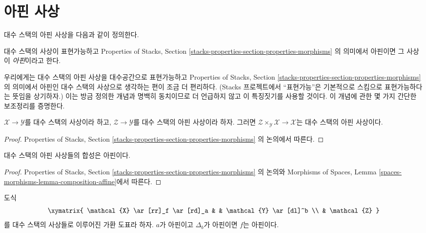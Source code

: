 \section{아핀 사상}
\label{section-affine}

\noindent
대수 스택의 아핀 사상을 다음과 같이 정의한다.

\begin{definition}
\label{definition-affine}
대수 스택의 사상이 표현가능하고 Properties of Stacks, Section
\ref{stacks-properties-section-properties-morphisms}
의 의미에서 아핀이면 그 사상이 {\it 아핀}이라고 한다.
\end{definition}

\noindent
우리에게는 대수 스택의 아핀 사상을 대수공간으로 표현가능하고
Properties of Stacks, Section
\ref{stacks-properties-section-properties-morphisms}의 의미에서 아핀인
대수 스택의 사상으로 생각하는 편이 조금 더 편리하다.
(Stacks 프로젝트에서 ``표현가능''은 기본적으로 스킴으로 표현가능하다는
뜻임을 상기하자.) 이는 방금 정의한 개념과 명백히 동치이므로 더 언급하지
않고 이 특징짓기를 사용할 것이다. 이 개념에 관한 몇 가지 간단한
보조정리를 증명한다.

\begin{lemma}
\label{lemma-base-change-affine}
$\mathcal{X} \to \mathcal{Y}$를 대수 스택의 사상이라 하고,
$\mathcal{Z} \to \mathcal{Y}$를 대수 스택의 아핀 사상이라 하자.
그러면 $\mathcal{Z} \times_\mathcal{Y} \mathcal{X} \to \mathcal{X}$는
대수 스택의 아핀 사상이다.
\end{lemma}

\begin{proof}
Properties of Stacks, Section
\ref{stacks-properties-section-properties-morphisms}
의 논의에서 따른다.
\end{proof}

\begin{lemma}
\label{lemma-composition-affine}
대수 스택의 아핀 사상들의 합성은 아핀이다.
\end{lemma}

\begin{proof}
Properties of Stacks, Section
\ref{stacks-properties-section-properties-morphisms}
의 논의와 Morphisms of Spaces, Lemma
\ref{spaces-morphisms-lemma-composition-affine}에서 따른다.
\end{proof}

\begin{lemma}
\label{lemma-affine-permanence}
도식
$$
\xymatrix{
\mathcal{X} \ar[rr]_f \ar[rd]_a & & \mathcal{Y} \ar[dl]^b \\
& \mathcal{Z}
}
$$
를 대수 스택의 사상들로 이루어진 가환 도표라 하자.
$a$가 아핀이고 $\Delta_b$가 아핀이면 $f$는 아핀이다.
\end{lemma}

